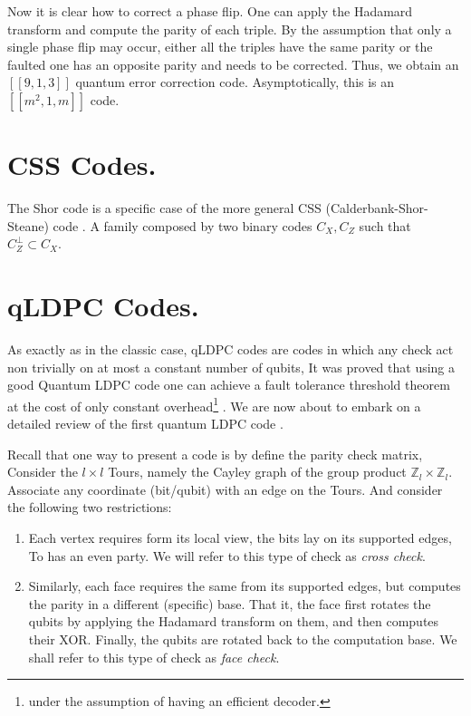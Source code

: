 \documentclass[12pt,a4paper]{article}
\begin{document}
Now it is clear how to correct a phase flip. One can apply the Hadamard transform and compute the parity of each triple. By the assumption that only a single phase flip may occur, either all the triples have the same parity or the faulted one has an opposite parity and needs to be corrected. Thus, we obtain an $\left[ \left[ 9,1,3 \right] \right]$ quantum error correction code. Asymptotically, this is an $\left[ \left[ m^{2}, 1, m \right] \right]$ code.

\section{CSS Codes.}

The Shor code is a specific case of the more general CSS (Calderbank-Shor-Steane) code \cite{Calderbank_1996}. A family composed by two binary codes $C_{X}, C_{Z}$ such that $C_{Z}^{\perp} \subset C_{X}$. 



  \section{qLDPC Codes.}
  As exactly as in the classic case, qLDPC codes are codes in which any check act non trivially on at most a constant number of qubits, It was proved that using a good Quantum LDPC code one can achieve a fault tolerance threshold theorem at the cost of only constant overhead\footnote{under the assumption of having an efficient decoder.} \cite{gottesman2014faulttolerant}. We are now about to embark on a detailed review of the first quantum LDPC code \cite{Dennis_2002}. 

  Recall that one way to present a code is by define the parity check matrix, Consider the $l\times l$ Tours, namely the Cayley graph of the group product  $\mathbb{Z}_{l} \times \mathbb{Z}_{l}$. Associate any coordinate (bit/qubit) with an edge on the Tours. And consider the following two restrictions:

  \begin{enumerate}
    \item Each vertex requires form its local view, the bits lay on its supported edges, To has an even party. We will refer to this type of check as \textit{cross check}. 
    \item Similarly, each face requires the same from its supported edges, but computes the parity in a different (specific) base. That it, the face first rotates the qubits by applying the Hadamard transform on them, and then computes their XOR. Finally, the qubits are rotated back to the computation base. We shall refer to this type of check as \textit{face check}.
  \end{enumerate}
\end{document}
